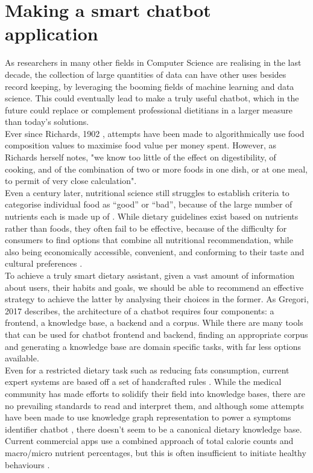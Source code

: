 \section{Making a smart chatbot application}
As researchers in many other fields in Computer Science are realising in the last decade, the collection of large quantities of data can have other uses besides record keeping, by leveraging the booming fields of machine learning and data science. This could eventually lead to make a truly useful chatbot, which in the future could replace or complement professional dietitians in a larger measure than today's solutions. \\
Ever since Richards, 1902 \cite{Richards1902a}, attempts have been made to algorithmically use food composition values to maximise food value per money spent. However, as Richards herself notes, "we know too little of the effect on digestibility, of cooking, and of the combination of two or more foods in one dish, or at one meal, to permit of very close calculation". \\
Even a century later, nutritional science still struggles to establish criteria to categorise individual food as ``good'' or ``bad'', because of the large number of nutrients each is made up of \cite{USDAFoodandNutritionService2007}. While dietary guidelines exist based on nutrients rather than foods, they often fail to be effective, because of the difficulty for consumers to find options that combine all nutritional recommendation, while also being economically accessible, convenient, and conforming to their taste and cultural preferences \cite{Green2015}. \\
To achieve a truly smart dietary assistant, given a vast amount of information about users, their habits and goals, we should be able to recommend an effective strategy to achieve the latter by analysing their choices in the former. As Gregori, 2017 \cite{Gregori} describes, the architecture of a chatbot requires four components: a frontend, a knowledge base, a backend and a corpus. While there are many tools that can be used for chatbot frontend and backend, finding an appropriate corpus and generating a knowledge base are domain specific tasks, with far less options available. \\
Even for a restricted dietary task such as reducing fats consumption, current expert systems are based off a set of handcrafted rules \cite{Prochaska2005}. While the medical community has made efforts to solidify their field into knowledge bases, there are no prevailing standards to read and interpret them, and although some attempts have been made to use knowledge graph representation to power a symptoms identifier chatbot \cite{minutoloa2017conversational}, there doesn't seem to be a canonical dietary knowledge base. Current commercial apps use a combined approach of total calorie counts and macro/micro nutrient percentages, but this is often insufficient to initiate healthy behaviours \cite{Davis2016}. \\
